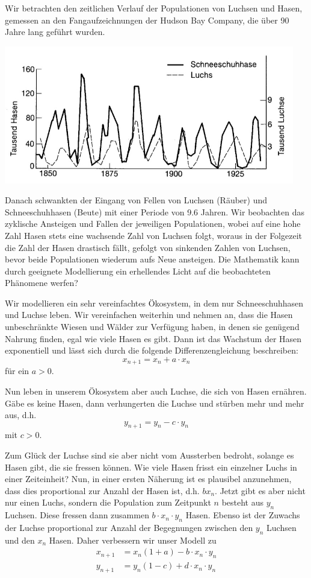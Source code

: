 \documentclass[%
<<<<<<< Updated upstream
11pt,%
twoside,%
titlepage,%
german,%
headsepline%
]{scrartcl}
\begin{document}
Wir betrachten den zeitlichen Verlauf der Populationen von Luchsen
und Hasen, gemessen an den Fangaufzeichnungen der Hudson Bay Company,
die über 90 Jahre lang geführt wurden.

\begin{center}
\includegraphics[height=6cm]{pictures/haseluchs.jpg}
\end{center}

Danach schwankten der Eingang von Fellen von Luchsen (Räuber) und Schneeschuhhasen (Beute) mit einer Periode von 9.6 Jahren. Wir beobachten das zyklische Ansteigen und Fallen der
jeweiligen Populationen, wobei auf eine hohe Zahl Hasen stets eine wachsende Zahl von Luchsen folgt, woraus in der Folgezeit die Zahl der Hasen drastisch fällt, gefolgt von sinkenden Zahlen von Luchsen, bevor beide Populationen wiederum aufs Neue ansteigen. Die Mathematik kann durch geeignete Modellierung ein erhellendes Licht auf die beobachteten Phänomene werfen?

Wir modellieren ein sehr vereinfachtes Ökosystem, in dem nur Schneeschuhhasen und Luchse leben. Wir vereinfachen weiterhin und nehmen an, dass die Hasen unbeschränkte Wiesen und Wälder zur Verfügung haben, in denen sie genügend Nahrung finden, egal wie viele Hasen es gibt. Dann ist das Wachstum der Hasen exponentiell und lässt sich durch die folgende Differenzengleichung beschreiben:
$$x_{n+1}=x_n+a\cdot x_n$$
für ein $a>0$.

Nun leben in unserem Ökosystem aber auch Luchse, die sich von Hasen ernähren. Gäbe es keine Hasen, dann verhungerten die Luchse und stürben mehr und mehr aus, d.h.
$$y_{n+1}=y_n-c\cdot y_n$$
mit $c>0$.

Zum Glück der Luchse sind sie aber nicht vom Aussterben bedroht, solange es Hasen gibt, die sie fressen können. Wie viele Hasen frisst ein einzelner Luchs in einer Zeiteinheit? Nun, in einer ersten Näherung ist es plausibel anzunehmen, dass dies proportional zur Anzahl der Hasen ist, d.h. $bx_n$. Jetzt gibt es aber nicht nur einen Luchs, sondern die Population zum Zeitpunkt $n$ besteht aus $y_n$ Luchsen. Diese fressen dann zusammen $b\cdot x_n\cdot y_n$ Hasen. Ebenso ist der Zuwachs der Luchse proportional zur Anzahl der Begegnungen zwischen den $y_n$ Luchsen und den $x_n$ Hasen. Daher verbessern wir unser Modell zu
\begin{align*}
x_{n+1}&=x_n(1+a)-b\cdot x_n\cdot y_n\\
y_{n+1}&=y_n(1-c)+d\cdot x_n\cdot y_n
\end{align*}
\end{document}
